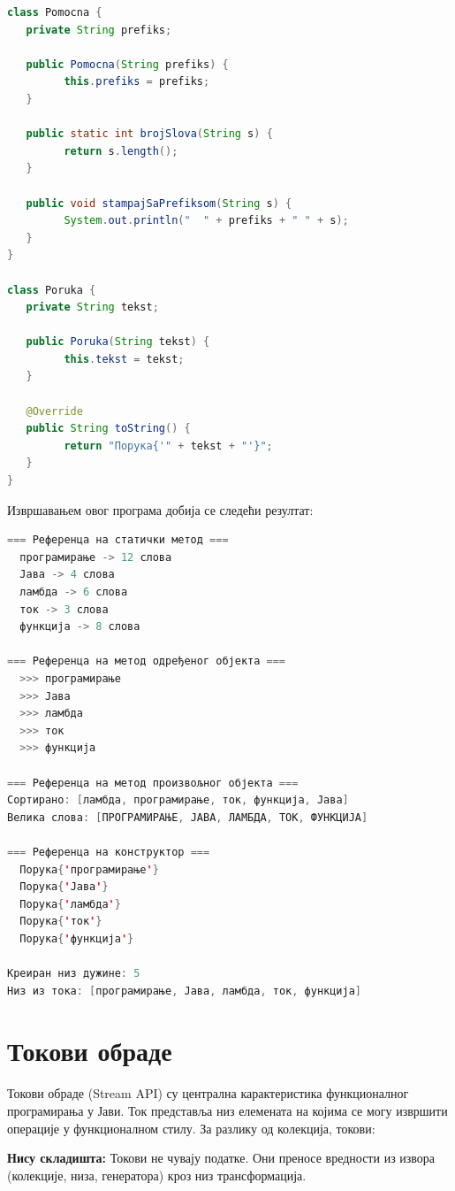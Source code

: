 \begin{lstlisting}[language=Java]
class Pomocna {
   private String prefiks;
 
   public Pomocna(String prefiks) {
         this.prefiks = prefiks;
   }
 
   public static int brojSlova(String s) {
         return s.length();
   }
 
   public void stampajSaPrefiksom(String s) {
         System.out.println("  " + prefiks + " " + s);
   }
}
 
class Poruka {
   private String tekst;
 
   public Poruka(String tekst) {
         this.tekst = tekst;
   }
 
   @Override
   public String toString() {
         return "Порука{'" + tekst + "'}";
   }
}
\end{lstlisting}


Извршавањем овог програма добија се следећи резултат:

\begin{lstlisting}[language=Java]
=== Референца на статички метод ===
  програмирање -> 12 слова
  Јава -> 4 слова
  ламбда -> 6 слова
  ток -> 3 слова
  функција -> 8 слова
 
=== Референца на метод одређеног објекта ===
  >>> програмирање
  >>> Јава
  >>> ламбда
  >>> ток
  >>> функција
 
=== Референца на метод произвољног објекта ===
Сортирано: [ламбда, програмирање, ток, функција, Јава]
Велика слова: [ПРОГРАМИРАЊЕ, ЈАВА, ЛАМБДА, ТОК, ФУНКЦИЈА]
 
=== Референца на конструктор ===
  Порука{'програмирање'}
  Порука{'Јава'}
  Порука{'ламбда'}
  Порука{'ток'}
  Порука{'функција'}
 
Креиран низ дужине: 5
Низ из тока: [програмирање, Јава, ламбда, ток, функција]
\end{lstlisting}


\section{Токови обраде}

Токови обраде (Stream API)\textbf{ }су централна карактеристика функционалног програмирања у Јави. Ток представља низ елемената на којима се могу извршити операције у функционалном стилу. За разлику од колекција, токови:

\textbf{Нису складишта:} Токови не чувају податке. Они преносе вредности из извора (колекције, низа, генератора) кроз низ трансформација.

